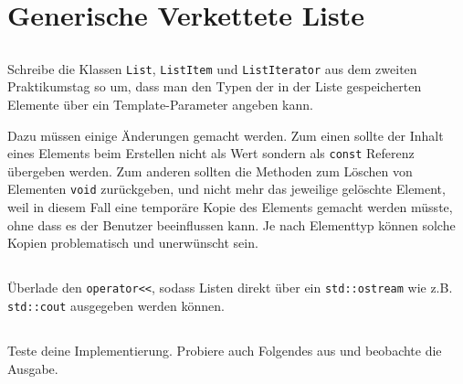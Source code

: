 \section{\ExercisePrefixAdvanced Generische Verkettete Liste}
\label{sec:list}
\subsection{}
Schreibe die Klassen \lstinline{List}, \lstinline{ListItem} und \lstinline{ListIterator} aus dem zweiten Praktikumstag so um, dass man den Typen der in der Liste gespeicherten Elemente über ein Template-Parameter angeben kann.

Dazu müssen einige Änderungen gemacht werden.
Zum einen sollte der Inhalt eines Elements beim Erstellen nicht als Wert sondern als \lstinline{const} Referenz übergeben werden.
Zum anderen sollten die Methoden zum Löschen von Elementen \lstinline{void} zurückgeben, und nicht mehr das jeweilige gelöschte Element, weil in diesem Fall eine temporäre Kopie des Elements gemacht werden müsste, ohne dass es der Benutzer beeinflussen kann.
Je nach Elementtyp können solche Kopien problematisch und unerwünscht sein.


\subsection{}
Überlade den \lstinline{operator<<}, sodass Listen direkt über ein \lstinline{std::ostream} wie z.B. \lstinline{std::cout} ausgegeben werden können.

\subsection{}
Teste deine Implementierung.
Probiere auch Folgendes aus und beobachte die Ausgabe.



